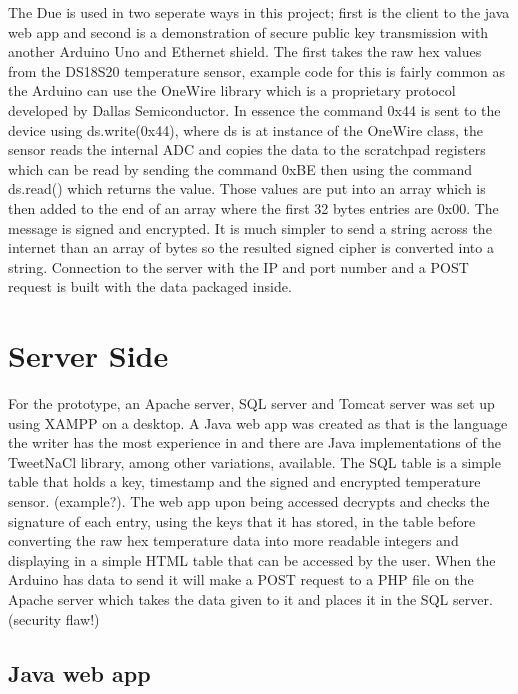 The Due is used in two seperate ways in this project; first is the client to the java web app and second is a demonstration of secure public key transmission with another Arduino Uno and Ethernet shield. The first takes the raw hex values from the DS18S20 temperature sensor, example code for this is fairly common as the Arduino can use the OneWire library which is a proprietary protocol developed by Dallas Semiconductor. In essence the command 0x44 is sent to the device using ds.write(0x44), where ds is at instance of the OneWire class,
the sensor reads the internal ADC and copies the data to the scratchpad registers which can be read by sending the command 0xBE then using the command ds.read() which returns the value. Those values are put into an array which is then added to the end of an array where the first 32 bytes entries are 0x00. The message is signed and encrypted. It is much simpler to send a string across the internet than an array of bytes so the resulted signed cipher is converted into a string. Connection to the server with the IP and port number and a POST request is built with the data packaged inside. 
 
\section{Server Side}

For the prototype, an Apache server, SQL server and Tomcat server was set up using XAMPP on a desktop. A Java web app was created as that is the language the writer has the most experience in and there are Java implementations of the TweetNaCl library, among other variations, available. The SQL table is a simple table that holds a key, timestamp and the signed and encrypted temperature sensor. (example?). The web app upon being accessed decrypts and checks the signature of each entry, using the keys that it has stored, in the table before converting the raw hex temperature data into more readable integers and displaying in a simple HTML table that can be accessed by the user. When the Arduino has data to send it will make a POST request to a PHP file on the Apache server which takes the data given to it and places it in the SQL server. (security flaw!)

\subsection{Java web app}

